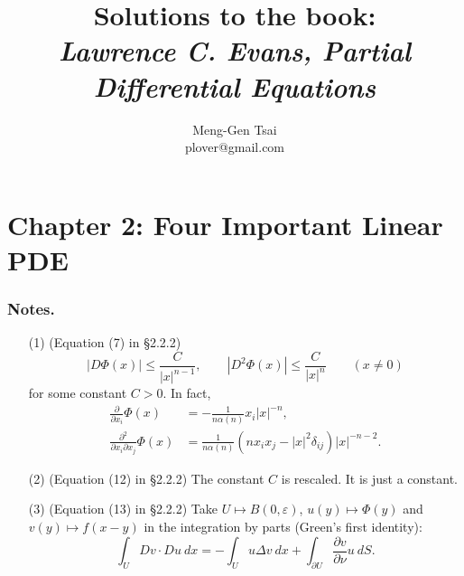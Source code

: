 \documentclass{article}
\title{\textbf{Solutions to the book: \\
\emph{Lawrence C. Evans, Partial Differential Equations}}}
\author{Meng-Gen Tsai \\ plover@gmail.com}
\begin{document}
\maketitle
\tableofcontents












\newpage
\section*{Chapter 2: Four Important Linear PDE \\}



\subsubsection*{Notes.}
\begin{enumerate}
\item[(1)]
  (Equation (7) in \S 2.2.2)
  \[
    |D\Phi(x)| \leq \frac{C}{|x|^{n-1}}, \qquad
    |D^2\Phi(x)| \leq \frac{C}{|x|^{n}} \qquad (x \neq 0)
  \]
  for some constant $C > 0$.
  In fact,
  \begin{align*}
  \frac{\partial}{\partial x_i}\Phi(x)
  &= -\frac{1}{n\alpha(n)} x_i |x|^{-n}, \\
  \frac{\partial^2}{\partial x_i \partial x_j}\Phi(x)
  &= \frac{1}{n\alpha(n)} (n x_i x_j - |x|^2 \delta_{ij}) |x|^{-n-2}.
  \end{align*}

\item[(2)]
  (Equation (12) in \S 2.2.2)
  The constant $C$ is rescaled.
  It is just a constant.

\item[(3)]
  (Equation (13) in \S 2.2.2)
  Take $U \mapsto B(0,\varepsilon)$, $u(y) \mapsto \Phi(y)$ and $v(y) \mapsto f(x-y)$
  in the integration by parts (Green's first identity):
  \[
    \int_{U} Dv \cdot Du \: dx
    = -\int_{U} u \Delta v \: dx
      + \int_{\partial U} \frac{\partial v}{\partial \nu} u \: dS.
  \] \\
\end{enumerate}
\end{document}
